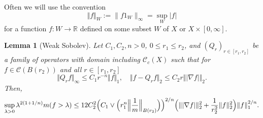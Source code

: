 \documentclass[10pt]{amsart}
\theoremstyle{plain}
\newtheorem{lemma}[theorem]{Lemma}
\theoremstyle{definition}
\newcommand{\RR}{\mathbb{R}}
\newcommand{\cC}{\mathcal{C}}
\begin{document}
Often we will use the convention
\[
\Vert f\Vert_W:={\|f1_{W}\|_{\infty}=}\sup_W\vert f\vert
\]
for a function $f\colon W\to \RR$ defined on some subset $ W $ of $ X $ or $ X\times [0,\infty]$.
\begin{lemma}[Weak Sobolev]\label{lem:weakS}Let $C_1,C_2,n>0$, $0\leq r_1\leq r_2$,
and $(Q_{r})_{r\in[r_1, r_2]}$ be a family of operators with domain including $\cC_c(X)$ such that for $f\in\cC( B(r_2))$ and all $r\in [ r_1, r_2]$
\[
\Vert Q_{r}f\Vert_\infty\leq C_1 r^{-n}\Vert f\Vert_1, \quad \Vert f-Q_{r}f\Vert_2\leq C_2 r\Vert |\nabla f|\Vert_2.
\]
Then,
\[
\sup_{\lambda>0}\lambda^{2(1+1/n)}m(f>\lambda)
\leq 12 C_2^2
\Bigl(C_1\vee \Bigl(r_1^n \Bigl\Vert\frac1m\Bigr\Vert_{B(r_2)}\Bigr)\Bigr)^{{2}/{n}}
\Bigl( \Vert|\nabla f|\Vert_2^2+\frac{1}{r_2^2}\Vert f\Vert_2^2\Bigr)\Vert f\Vert_1^{2/n}.
\]
\end{lemma}
\end{document}
